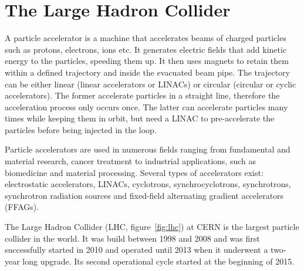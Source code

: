 \section{The Large Hadron Collider}
\label{subsec:lhc}
A particle accelerator is a machine that accelerates beams of charged particles such as protons, electrons, ions etc. It generates electric fields that add kinetic energy to the particles, speeding them up. It then uses magnets to retain them within a defined trajectory and inside the evacuated beam pipe. The trajectory can be either linear (linear accelerators or LINACs) or circular (circular or cyclic accelerators). The former accelerate particles in a straight line, therefore the acceleration process only occurs once. The latter can accelerate particles many times while keeping them in orbit, but need a LINAC to pre-accelerate the particles before being injected in the loop.

Particle accelerators are used in numerous fields ranging from fundamental and material research, cancer treatment to industrial applications, such as biomedicine and material processing. Several types of accelerators exist: electrostatic accelerators, LINACs, cyclotrons, synchrocyclotrons, synchrotrons, synchrotron radiation sources and fixed-field alternating gradient accelerators (FFAGs).

The Large Hadron Collider (LHC, figure~\ref{fig:lhc}) at CERN is the largest particle collider in the world. It was build between 1998 and 2008 and was first successfully started in 2010 and operated until 2013 when it underwent a two-year long upgrade. Its second operational cycle started at the beginning of 2015.

